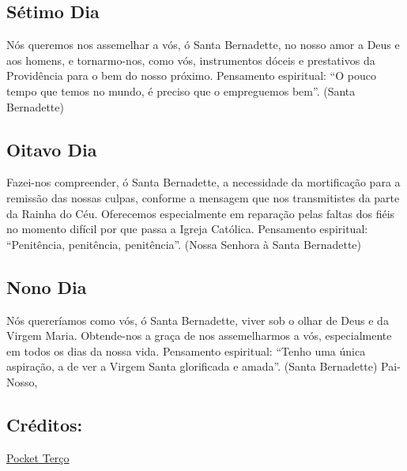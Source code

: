 \documentclass[18pt]{article}
\begin{document}
\begin{justify}
\textbf{\textit{}} %

\subsection*{Sétimo Dia}

\textbf{\textit{}} %

Nós queremos nos assemelhar a vós, ó Santa Bernadette, no nosso amor a Deus e aos homens, e tornarmo-nos, como vós, instrumentos dóceis e prestativos da Providência para o bem do nosso próximo. Pensamento espiritual: “O pouco tempo que temos no mundo, é preciso que o empreguemos bem”. (Santa Bernadette)

\textbf{\textit{}} %

\subsection*{Oitavo Dia}

\textbf{\textit{}} %

Fazei-nos compreender, ó Santa Bernadette, a necessidade da mortificação para a remissão das nossas culpas, conforme a mensagem que nos transmitistes da parte da Rainha do Céu. Oferecemos especialmente em reparação pelas faltas dos fiéis no momento difícil por que passa a Igreja Católica. Pensamento espiritual: “Penitência, penitência, penitência”. (Nossa Senhora à Santa Bernadette)

\textbf{\textit{}} %

\subsection*{Nono Dia}

\textbf{\textit{}} %

Nós quereríamos como vós, ó Santa Bernadette, viver sob o olhar de Deus e da Virgem Maria. Obtende-nos a graça de nos assemelharmos a vós, especialmente em todos os dias da nossa vida. Pensamento espiritual: “Tenho uma única aspiração, a de ver a Virgem Santa glorificada e amada”. (Santa Bernadette) Pai-Nosso,

\textbf{\textit{}} %



\centering

\vfill
\subsection*{Créditos:}
\href{https://pocketterco.com.br/terco/novena-a-santa-bernadette-soubirous-inicia-em-7-de-abril}{Pocket Terço}


\end{justify}
\end{document}
